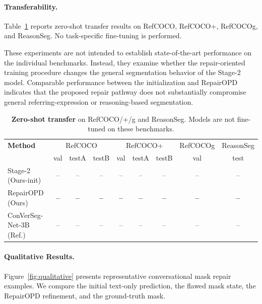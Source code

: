 \paragraph{Transferability.}
Table~\ref{tab:refcoco} reports zero-shot transfer results on RefCOCO, RefCOCO+, RefCOCOg, and ReasonSeg.
No task-specific fine-tuning is performed.

These experiments are not intended to establish state-of-the-art performance on the individual benchmarks.
Instead, they examine whether the repair-oriented training procedure changes the general segmentation behavior of the Stage-2 model.
Comparable performance between the initialization and RepairOPD indicates that the proposed repair pathway does not substantially compromise general referring-expression or reasoning-based segmentation.


\begin{table}[t]
    \centering
    \caption{
    \textbf{Zero-shot transfer} on RefCOCO/+/g and ReasonSeg.
    Models are not fine-tuned on these benchmarks.
    }
    \label{tab:refcoco}
    \small
    \setlength{\tabcolsep}{4pt}
    \begin{tabular}{lcccccccc}
        \toprule
        \textbf{Method}
        & \multicolumn{3}{c}{RefCOCO}
        & \multicolumn{3}{c}{RefCOCO+}
        & RefCOCOg
        & ReasonSeg \\
        \cmidrule(lr){2-4}
        \cmidrule(lr){5-7}
        \cmidrule(lr){8-8}
        \cmidrule(lr){9-9}
        & val & testA & testB
        & val & testA & testB
        & val & test \\
        \midrule
        Stage-2 (Ours-init)
        & -- & -- & --
        & -- & -- & --
        & -- & -- \\

        RepairOPD (Ours)
        & \textbf{--} & \textbf{--} & \textbf{--}
        & \textbf{--} & \textbf{--} & \textbf{--}
        & \textbf{--} & \textbf{--} \\

        ConVerSeg-Net-3B (Ref.)~\cite{sahoo2026convseg}
        & -- & -- & --
        & -- & -- & --
        & -- & -- \\
        \bottomrule
    \end{tabular}
\end{table}


\paragraph{Qualitative Results.}
Figure~\ref{fig:qualitative} presents representative conversational mask repair examples.
We compare the initial text-only prediction, the flawed mask state, the RepairOPD refinement, and the ground-truth mask.

